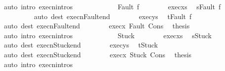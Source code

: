 \begin{isabellebody}
\ {\isacharparenleft}auto\ intro{\isacharcolon}\ execn{\isachardot}intros{\isacharparenright}\isanewline
\ \ \ \ \isamarkupfalse%
\isanewline
\ \ \ \ \ \ \isamarkupfalse%
\ {\isacharparenleft}Fault\ f{\isacharparenright}\isanewline
\ \ \ \ \ \ \isamarkupfalse%
\ exec{\isacharunderscore}xs\ \isamarkupfalse%
\ {\isachardoublequoteopen}s{\isacharprime}{\isacharequal}Fault\ f{\isachardoublequoteclose}\isanewline
\ \ \ \ \ \ \ \ \isamarkupfalse%
\ {\isacharparenleft}auto\ dest{\isacharcolon}\ execn{\isacharunderscore}Fault{\isacharunderscore}end{\isacharparenright}\isanewline
\ \ \ \ \ \ \isamarkupfalse%
\ exec{\isacharunderscore}ys\ \isamarkupfalse%
\ {\isachardoublequoteopen}t{\isacharequal}Fault\ f{\isachardoublequoteclose}\isanewline
\ \ \ \ \ \ \ \ \isamarkupfalse%
\ {\isacharparenleft}auto\ dest{\isacharcolon}\ execn{\isacharunderscore}Fault{\isacharunderscore}end{\isacharparenright}\isanewline
\ \ \ \ \ \ \isamarkupfalse%
\ exec{\isacharunderscore}x\ Fault\ Cons\ \isamarkupfalse%
\ {\isacharquery}thesis\isanewline
\ \ \ \ \ \ \ \ \isamarkupfalse%
\ {\isacharparenleft}auto\ intro{\isacharcolon}\ execn{\isachardot}intros{\isacharparenright}\isanewline
\ \ \ \ \isamarkupfalse%
\isanewline
\ \ \ \ \ \ \isamarkupfalse%
\ Stuck\isanewline
\ \ \ \ \ \ \isamarkupfalse%
\ exec{\isacharunderscore}xs\ \isamarkupfalse%
\ {\isachardoublequoteopen}s{\isacharprime}{\isacharequal}Stuck{\isachardoublequoteclose}\isanewline
\ \ \ \ \ \ \ \ \isamarkupfalse%
\ {\isacharparenleft}auto\ dest{\isacharcolon}\ execn{\isacharunderscore}Stuck{\isacharunderscore}end{\isacharparenright}\isanewline
\ \ \ \ \ \ \isamarkupfalse%
\ exec{\isacharunderscore}ys\ \isamarkupfalse%
\ {\isachardoublequoteopen}t{\isacharequal}Stuck{\isachardoublequoteclose}\isanewline
\ \ \ \ \ \ \ \ \isamarkupfalse%
\ {\isacharparenleft}auto\ dest{\isacharcolon}\ execn{\isacharunderscore}Stuck{\isacharunderscore}end{\isacharparenright}\isanewline
\ \ \ \ \ \ \isamarkupfalse%
\ exec{\isacharunderscore}x\ Stuck\ Cons\ \isamarkupfalse%
\ {\isacharquery}thesis\isanewline
\ \ \ \ \ \ \ \ \isamarkupfalse%
\ {\isacharparenleft}auto\ intro{\isacharcolon}\ execn{\isachardot}intros{\isacharparenright}\isanewline
\ \ \ \ \isamarkupfalse%
\isanewline

\end{isabellebody}
